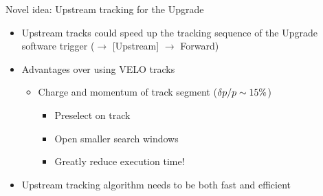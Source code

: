 \documentclass[aspectratio=1610]{beamer}
\begin{document}
\begin{frame}{Novel idea: Upstream tracking for the Upgrade}
\begin{itemize}
  \item Upstream tracks could speed up the tracking sequence of the Upgrade software trigger (\velo $\to$ [Upstream] $\to$ Forward)
\end{itemize}
\begin{itemize}
  \item Advantages over using VELO tracks
    \begin{itemize}
      \item Charge and momentum of track segment ($\delta \mbox{$p$}/\mbox{$p$} \sim 15 \%$)
      \begin{itemize}
        \item[\ding{212}] Preselect on track \pt
        \item[\ding{212}] Open smaller search windows
        \item[\ding{70}] Greatly reduce execution time!
      \end{itemize}
    \end{itemize}
  \end{itemize}

  \begin{center}
  
  \end{center}

  \begin{itemize}
  \item Upstream tracking algorithm needs to be both fast and efficient
  \end{itemize}
\end{frame}
\end{document}
